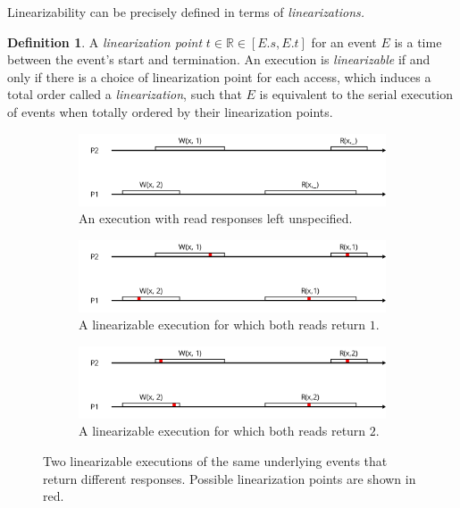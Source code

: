 \documentclass[]             %
{NASA}                       %
\theoremstyle{definition}
\newtheorem{definition}{Definition}[section]
\begin{document}
Linearizability can be precisely defined in terms of
\emph{linearizations.}

\begin{definition}
A \emph{linearization point} $t \in \mathbb{R} \in [E.s, E.t]$ for an
event $E$ is a time between the event's start and termination. An
execution is \emph{linearizable} if and only if there is a choice of
linearization point for each access, which induces a total order called a \emph{linearization},
such that $E$ is equivalent to
the serial execution of events when totally ordered by their
linearization points.
\end{definition}

\begin{figure}[p]
     \begin{subfigure}[a]{1\textwidth}
         \center
         \includegraphics[scale=0.4]{images/linearTemplate.png}
         \caption{An execution with read responses left unspecified.}
         \label{fig:nonlinear}
     \end{subfigure}
     \begin{subfigure}[b]{1\textwidth}
         \center
         \includegraphics[scale=0.4]{images/linear3.png}
         \caption{A linearizable execution for which both reads return $1$.}
     \end{subfigure}
     \begin{subfigure}[c]{1\textwidth}
         \center
         \includegraphics[scale=0.4]{images/linear2.png}
         \caption{A linearizable execution for which both reads return $2$.}
     \end{subfigure}
  \caption{Two linearizable executions of the same underlying events that return different responses. Possible linearization points are shown in red.}
  \label{fig:linearization}
\end{figure}
\end{document}
